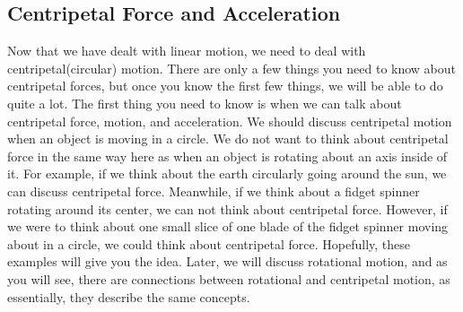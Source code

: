 \documentclass{article}[gray]
\numberwithin{equation}{subsection}
\begin{document}
\subsection{Centripetal Force and Acceleration}
\newline

Now that we have dealt with linear motion, we need to deal with centripetal(circular) motion. There are only a few things you need to know about centripetal forces, but once you know the first few things, we will be able to do quite a lot. The first thing you need to know is when we can talk about centripetal force, motion, and acceleration. We should discuss centripetal motion when an object is moving in a circle. We do not want to think about centripetal force in the same way here as when an object is rotating about an axis inside of it. For example, if we think about the earth circularly going around the sun, we can discuss centripetal force. Meanwhile, if we think about a fidget spinner rotating around its center, we can not think about centripetal force. However, if we were to think about one small slice of one blade of the fidget spinner moving about in a circle, we could think about centripetal force. Hopefully, these examples will give you the idea. Later, we will discuss rotational motion, and as you will see, there are connections between rotational and centripetal motion, as essentially, they describe the same concepts.
\end{document}
